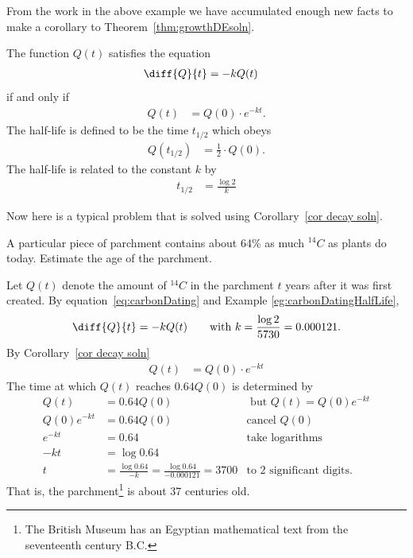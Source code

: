 From the work in the above example we have accumulated enough new facts to make
a corollary to Theorem~\ref{thm:growthDEsoln}.
\begin{cor}\label{cor decay soln}
 The function $Q(t)$ satisfies the equation
\begin{align*}
  \diff{Q}{t} &= -k Q(t)
\end{align*}
if and only if
\begin{align*}
  Q(t) &= Q(0) \cdot e^{-kt}.
\end{align*}
The half-life is defined to be the time $t_{1/2}$ which obeys
\begin{align*}
 Q(t_{1/2}) &= \frac{1}{2} \cdot Q(0).
\end{align*}
The half-life is related to the constant $k$ by
\begin{align*}
  t_{1/2} &=  \frac{\log 2}{k}
\end{align*}

\end{cor}





Now here is a typical problem that is solved using Corollary~\ref{cor decay
soln}.
\begin{eg}\label{eg:carbonDating}

A particular piece of parchment contains about 64\% as much ${}^{14}C$ as
plants do today. Estimate the age of the parchment.


\soln
Let $Q(t)$ denote the amount of ${}^{14}C$ in the parchment
$t$ years after it was first created.
By equation~\eqref{eq:carbonDating} and
Example \ref{eg:carbonDatingHalfLife},
\begin{align*}
\diff{Q}{t}=-k Q(t)\qquad\text{with }k = \frac{\log 2}{5730} = 0.000121.
\end{align*}
By Corollary~\ref{cor decay soln}
\begin{align*}
  Q(t) &= Q(0) \cdot e^{-kt}
\end{align*}
The time at which $Q(t)$ reaches $0.64 Q(0)$ is determined by
\begin{align*}
  Q(t) &=0.64 Q(0) & \text{ but } Q(t) = Q(0) e^{-kt} \\
  Q(0)e^{-kt} &=0.64 Q(0) & \text{cancel $Q(0)$}\\
  e^{-kt} &=0.64 & \text{take logarithms}\\
  -kt &=\log 0.64 \\
  t &=\frac{\log 0.64}{-k} =\frac{\log 0.64}{-0.000121} = 3700 & \text{to 2 significant
digits.}
\end{align*}
That is, the parchment\footnote{The British Museum has an Egyptian mathematical
text from the seventeenth century B.C.} is about 37 centuries old.
\end{eg}

